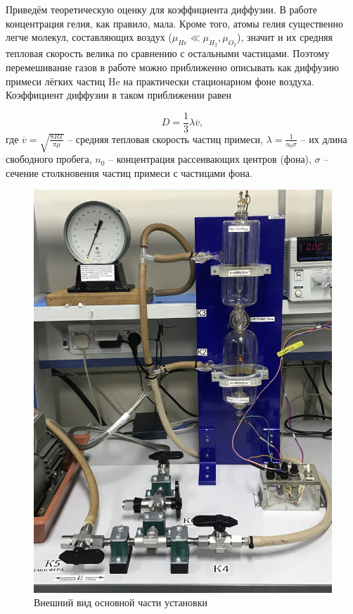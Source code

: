 \documentclass[a4paper,12pt]{article}
\begin{document}
 Приведём теоретическую оценку для коэффициента диффузии. В работе концентрация гелия, как правило, мала. Кроме того, атомы гелия существенно легче молекул, составляющих воздух ($\mu_{He} \ll \mu_{H_2}, \mu_{O_2}$), значит
 и их средняя тепловая скорость велика по сравнению с остальными частицами. Поэтому перемешивание газов в работе можно приближенно описывать как диффузию примеси лёгких частиц He на практически стационарном фоне воздуха. Коэффициент диффузии в таком приближении равен
 
 \begin{equation}\label{2}
 D = \frac{1}{3}\lambda\overline{v}, 
 \end{equation}
 где $\overline{v} = \sqrt{\frac{8RT}{\pi \mu}}$ -- средняя тепловая скорость частиц примеси, $\lambda = \frac{1}{n_0 \sigma}$ -- их длина свободного пробега, $n_0 $ -- концентрация рассеивающих центров (фона), $\sigma$ -- сечение столкновения частиц примеси с частицами фона. 
 
 
   	\begin{figure} 
 	\centering 
 	\includegraphics[scale=0.065]{plan.jpg} 
 	\caption{Внешний вид основной части установки} 
 \end{figure}
\end{document}
